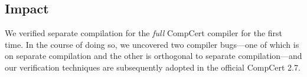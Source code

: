 \subsection{Impact}

We verified separate compilation for the \emph{full} CompCert compiler for the first time.  In the
course of doing so, we uncovered two compiler bugs---one of which is on separate compilation and the
other is orthogonal to separate compilation---and our verification techniques are subsequently
adopted in the official CompCert 2.7.



